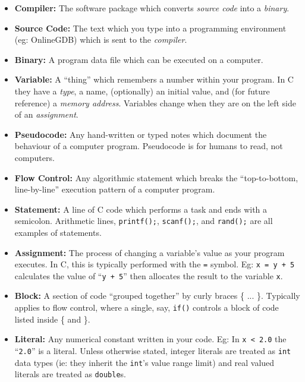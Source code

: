 \documentclass{lab}
\begin{document}
\begin{multicols}{2}
\begin{itemize}
\item \textbf{Compiler:} The software package which converts \textit{source code} into a \textit{binary}.
\item \textbf{Source Code:} The text which you type into a programming environment (eg: OnlineGDB) which is sent to the \textit{compiler}.
\item \textbf{Binary:} A program data file which can be executed on a computer.
\item \textbf{Variable:} A ``thing'' which remembers a number within your program. In C they have a \textit{type}, a name, (optionally) an initial value, and (for future reference) a \textit{memory address}. Variables change when they are on the left side of an \textit{assignment}.
\item \textbf{Pseudocode:} Any hand-written or typed notes which document the behaviour of a computer program. Pseudocode is for humans to read, not computers.
\item \textbf{Flow Control:} Any algorithmic statement which breaks the ``top-to-bottom, line-by-line'' execution pattern of a computer program.
\columnbreak
\item \textbf{Statement:} A line of C code which performs a task and ends with a semicolon. Arithmetic lines, \texttt{printf();}, \texttt{scanf();}, and \texttt{rand();} are all examples of statements.
\item \textbf{Assignment:} The process of changing a variable's value as your program executes. In C, this is typically performed with the \texttt{=} symbol. Eg: \texttt{x = y + 5} calculates the value of ``\texttt{y + 5}'' then allocates the result to the variable \texttt{x}.
\item \textbf{Block:} A section of code ``grouped together'' by curly braces \{ ... \}. Typically applies to flow control, where a single, say, \texttt{if()} controls a block of code listed inside \{ and \}.
\item \textbf{Literal:} Any numerical constant written in your code. Eg: In \texttt{x < 2.0} the ``\texttt{2.0}'' is a literal. Unless otherwise stated, integer literals are treated as \texttt{int} data types (ie: they inherit the \texttt{int}'s value range limit) and real valued literals are treated as \texttt{double}s.
\end{itemize}

\end{multicols}

\pagebreak
\end{document}
